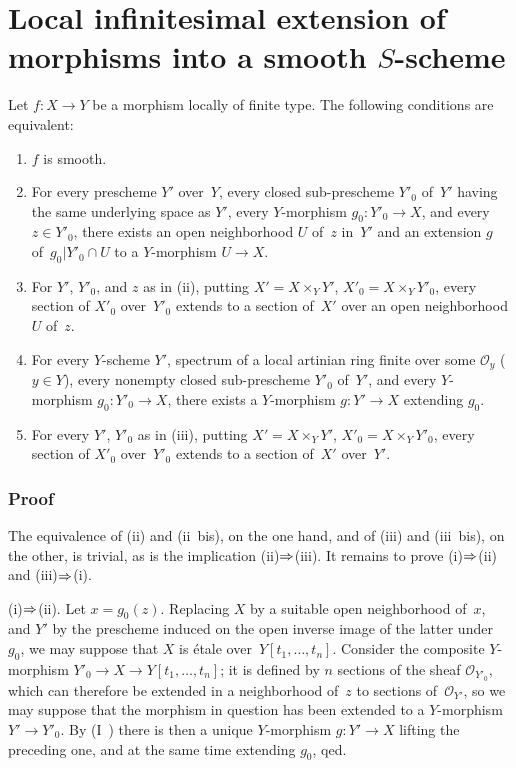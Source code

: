 \section{Local infinitesimal extension of morphisms into a smooth $S$-scheme}
\label{III.3}

\begin{theorem}
\label{III.3.1}
Let $f \colon X \to Y$ be a morphism locally of finite type.
The following conditions are equivalent:
\begin{enumerate}
\item[(i)] $f$ is smooth.
\item[(ii)] For every prescheme $Y'$ over~$Y$, every closed
sub-prescheme $Y'_0$ of~$Y'$ having the same underlying space as
$Y'$, every $Y$-morphism $g_0 \colon Y'_0 \to X$, and every
$z \in Y'_0$, there exists an open neighborhood $U$ of~$z$ in~$Y'$
and an extension $g$ of~$g_0|Y'_0 \cap U$ to a $Y$-morphism $U \to
X$.
\item[(ii~bis)] For $Y'$, $Y'_0$, and $z$ as in \textup{(ii)}, putting
$X' = X \times_Y Y'$, $X'_0 = X \times_Y Y'_0$, every section of
$X'_0$ over~$Y'_0$ extends to a section of~$X'$ over an open
neighborhood $U$ of~$z$.
\item[(iii)] For every $Y$-scheme $Y'$, spectrum of a local artinian
ring finite over some $\mathcal{O}_y$ ($y \in Y$), every nonempty
closed sub-prescheme $Y'_0$ of~$Y'$, and every $Y$-morphism
$g_0 \colon Y'_0 \to X$, there exists a $Y$-morphism $g
\colon Y' \to X$ extending $g_0$.
\item[(iii~bis)] For every $Y'$, $Y'_0$ as in \textup{(iii)}, putting
$X' = X \times_Y Y'$, $X'_0 = X \times_Y Y'_0$, every section of
$X'_0$ over~$Y'_0$ extends to a section of~$X'$ over~$Y'$.
\end{enumerate}
\end{theorem}

\subsubsection*{Proof} The equivalence of (ii) and (ii~bis), on the one hand, and of
(iii) and (iii~bis), on the other, is trivial, as is the implication
(ii)$\To$(iii). It remains to prove (i)$\To$(ii) and (iii)$\To$(i).

(i)$\To$(ii). Let $x = g_0(z)$. Replacing $X$ by a suitable open
neighborhood of~$x$, and $Y'$ by the prescheme induced on the open
inverse image of the latter under~$g_0$, we may suppose that $X$ is
\'etale over~$Y[t_1, \dots, t_n]$. Consider the composite $Y$-morphism
$Y'_0 \to X \to Y[t_1, \dots, t_n]$; it is defined by $n$ sections of
the sheaf $\mathcal{O}_{Y'_0}$, which can therefore be extended in a
neighborhood of~$z$ to sections of~$\mathcal{O}_{Y'}$, so we may suppose
that the morphism in question has been extended to a
$Y$-morphism $Y' \to Y'_0$. By (I~) there
is then a unique $Y$-morphism $g \colon Y' \to X$ lifting the preceding
one, and at the same time extending $g_0$, qed.

